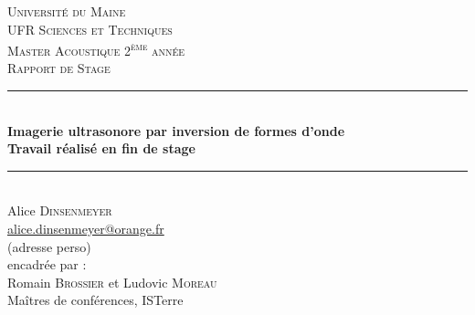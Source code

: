 \documentclass[a4paper,11pt]{report} %
\begin{document}

\begin{titlepage}

\newcommand{\HRule}{\rule{\linewidth}{0.5mm}} %

\center %
 

\textsc{\large Université du Maine \\ UFR Sciences et Techniques}\\[0.5cm] %

\textsc{ \large Master Acoustique 2\textsuperscript{ème} année}\\[3.0cm] %
\textsc{\Large Rapport de Stage}\\[0.5cm] %


\HRule \\[0.7cm]
{ \huge \bfseries Imagerie ultrasonore par inversion de formes d'onde\\[0.4cm] \large Travail réalisé en fin de stage}\\[0.4cm] %
\HRule \\[1.5cm]
 


{\Large Alice \textsc{Dinsenmeyer}\\ \url{alice.dinsenmeyer@orange.fr} \\ (adresse perso)}\\[3cm]

\Large encadrée par : \\[1cm]
Romain \textsc{Brossier} et
Ludovic \textsc{Moreau}\\
Maîtres de conférences, ISTerre



\end{titlepage}
\end{document}
